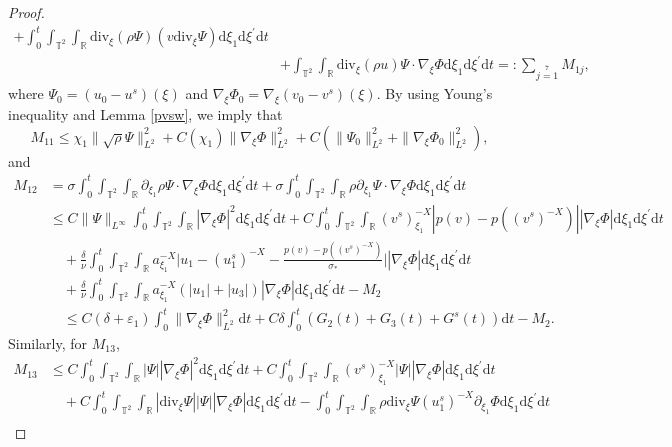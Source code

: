 \documentclass[10pt,reqno]{amsart}
\numberwithin{equation}{section}
\newcommand{\dif}{\mathrm{d}}
\newcommand{\ddiv}{\mathrm{div}}
\begin{document}
\begin{proof}
\begin{align*}
+\int_0^t\int_{\mathbb{T}^2}\int_{\mathbb{R}}
  \ddiv_\xi(\rho\Psi)  (v\ddiv_\xi\Psi)
    \dif \xi_1\dif \xi^{\prime}\dif t\\
    &
   + \int_{\mathbb{T}^2}\int_{\mathbb{R}}
\ddiv_{\xi}(\rho u)\Psi
\cdot\nabla_\xi\Phi\dif \xi_1\dif \xi^{\prime}\dif t
    =:\sum\limits_{j=1}\limits^7M_{1j},
\end{align*}
where $\Psi_0=(u_0-u^s)(\xi)$ and $\nabla_\xi\Phi_0=\nabla_\xi (v_0-v^s)(\xi)$. By using Young's inequality and Lemma \ref{pvsw}, we imply that
\[
M_{11}\le \chi_1\|\sqrt\rho\Psi\|_{L^2}^2+C(\chi_1)\|\nabla_\xi\Phi\|_{L^2}^2
+C(\|\Psi_0\|_{L^2}^2+\|\nabla_\xi\Phi_0\|_{L^2}^2),
\]
and
\begin{align*}
M_{12}&=
\sigma\int_0^t\int_{\mathbb{T}^2}\int_{\mathbb{R}}
\partial_{\xi_1}\rho \Psi \cdot\nabla_\xi\Phi
\dif \xi_1\dif \xi^{\prime}\dif t
+\sigma\int_0^t\int_{\mathbb{T}^2}\int_{\mathbb{R}}
\rho\partial_{\xi_1}\Psi \cdot\nabla_\xi\Phi
\dif \xi_1\dif \xi^{\prime}\dif t\\
&\le C\|\Psi\|_{L^\infty}\int_0^t\int_{\mathbb{T}^2}\int_{\mathbb{R}}|\nabla_\xi\Phi|^2\dif \xi_1\dif \xi^{\prime}\dif t
+C\int_0^t\int_{\mathbb{T}^2}\int_{\mathbb{R}}
(v^s)^{-X}_{\xi_1}|p(v)-p((v^s)^{-X})||\nabla_\xi\Phi|\dif \xi_1\dif \xi^{\prime}\dif t\\
&\quad+\frac{\delta}{\nu}\int_0^t\int_{\mathbb{T}^2}\int_{\mathbb{R}}
a_{\xi_1}^{-X}\Big|u_1-(u_1^s)^{-X}-\frac{p(v)-p((v^s)^{-X})}{\sigma_\ast}\Big||\nabla_\xi\Phi|\dif \xi_1\dif \xi^{\prime}\dif t\\
&\quad+\frac{\delta}{\nu}\int_0^t\int_{\mathbb{T}^2}\int_{\mathbb{R}}
a_{\xi_1}^{-X}(|u_1|+|u_3|)|\nabla_\xi\Phi|\dif \xi_1\dif \xi^{\prime}\dif t
-M_2\\
&\quad\le C(\delta+\varepsilon_1)\int_0^t\|\nabla_\xi\Phi\|_{L^2}^2\dif t
+C\delta\int_0^t\left(G_2(t)+G_3(t)+G^s(t)\right)\dif t-M_2.
\end{align*}
Similarly, for $M_{13}$,
\begin{align*}
M_{13}&\le C\int_0^t\int_{\mathbb{T}^2}\int_{\mathbb{R}}|\Psi||\nabla_\xi\Phi|^2\dif \xi_1\dif \xi^{\prime}\dif t
+C\int_0^t\int_{\mathbb{T}^2}\int_{\mathbb{R}}(v^s)^{-X}_{\xi_1}|\Psi||\nabla_\xi\Phi|\dif \xi_1\dif \xi^{\prime}\dif t\\
&\quad+C\int_0^t\int_{\mathbb{T}^2}\int_{\mathbb{R}}|\ddiv_{\xi}\Psi||\Psi||\nabla_\xi\Phi|\dif \xi_1\dif \xi^{\prime}\dif t
-\int_0^t\int_{\mathbb{T}^2}\int_{\mathbb{R}}
\rho\ddiv_\xi\Psi(u_1^s)^{-X}\partial_{\xi_1}\Phi\dif \xi_1\dif \xi^{\prime}\dif t\\

\end{align*}
\end{proof}
\end{document}
